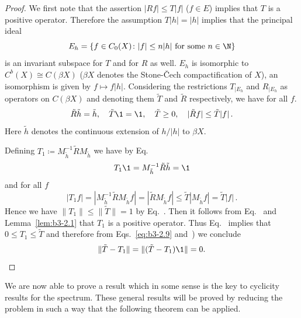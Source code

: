 \begin{proof}
	We first note that the assertion $|Rf| \leq T|f|$ ($f \in E$) implies that $T$ is a positive operator.
	Therefore the assumption $T|h| = |h|$ implies that the principal ideal 
    \[
    E_{h} = \{f \in C_{0}(X) \colon |f| \leq n|h| \text{ for some } n \in \N\}
    \] 
    is an invariant subspace for $T$ and for $R$ as well.
	$E_{h}$ is isomorphic to $C^{b}(X) \cong C(\beta X)$ ($\beta X$ denotes the Stone-Čech compactification of\/ $X$), an isomorphism is given by $f \mapsto f|h|$.
	Considering the restrictions $T_{|E_{h}}$ and $R_{|E_{h}}$ as operators on $C(\beta X)$ and denoting them $\tilde{T}$ and $\tilde{R}$ respectively, we have for all $f$.
\begin{equation}\label{eq:b3-2.9}
		\tilde{R}\tilde{h} = \tilde{h}, \quad \tilde{T}\1 = \1, \quad \tilde{T} \geq 0, \quad |\tilde{R}f| \leq \tilde{T}|f|\,.
	\end{equation}
	Here $\tilde{h}$ denotes the continuous extension of\/ $h/|h|$ to $\beta X$.
	
	Defining $T_{1} \coloneqq M_{\tilde{h}}^{-1}\tilde{R}M_{\tilde{h}}$ we have by Eq.~
	\begin{equation}\label{eq:b3-2.10}
	T_{1}\1 = M_{\tilde{h}}^{-1}\tilde{R}\tilde{h} = \1 
	\end{equation}
    and for all $f$ 
	\begin{equation}\label{eq:b3-2.11}
	|T_{1}f| = |M_{\tilde{h}}^{-1}\tilde{R}M_{\tilde{h}}f| = |\tilde{R}M_{\tilde{h}}f| \leq \tilde{T}|M_{\tilde{h}}f| = \tilde{T}|f|\,.
	\end{equation}
	Hence we have $\|T_{1}\| \leq \|\tilde{T}\| = 1$ by Eq.~.
	Then it follows from Eq.~ and Lemma~\ref{lem:b3-2.1} that $T_{1}$ is a positive operator.
	Thus Eq.~ implies that $0 \leq T_{1} \leq \tilde{T}$ and therefore from Eqs.~\eqref{eq:b3-2.9} and~) we conclude
    \[
    \|\tilde{T} - T_{1}\| = \|(\tilde{T} - T_{1})\1\| = 0.
    \qedhere
    \]
\end{proof}
We are now able to prove a result which in some sense is the key to cyclicity results for the spectrum.
	These general results will be proved by reducing the problem in such a way that the following theorem can be applied.

